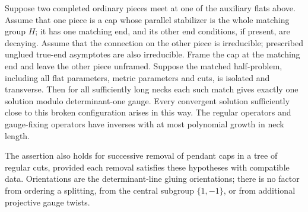 \begin{lemma}
\label{lem:ordinary:regular-gluing}
Suppose two completed ordinary pieces meet at one of the auxiliary
flats above.  Assume that one piece is a cap whose parallel stabilizer
is the whole matching group $H$; it has one matching end, and its
other end conditions, if present, are decaying.  Assume that the
connection on the other piece is irreducible; prescribed unglued
true-end asymptotes are also irreducible.  Frame the cap at the
matching end and leave the other piece unframed.  Suppose the
matched half-problem, including all flat parameters, metric parameters
and cuts, is isolated and transverse.  Then for all sufficiently long
necks each such match gives exactly one solution modulo
determinant-one gauge.  Every convergent solution sufficiently close
to this broken configuration arises in this way.  The regular
operators and gauge-fixing operators have inverses with at most
polynomial growth in neck length.

The assertion also holds for successive removal of pendant caps
in a tree of regular cuts, provided each removal satisfies these
hypotheses with compatible data.  Orientations are the determinant-line gluing
orientations; there is no factor from ordering a splitting, from
the central subgroup $\{1,-1\}$, or from additional projective
gauge twists.
\end{lemma}
